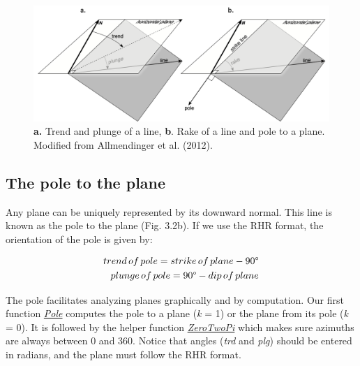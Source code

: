 \documentclass[a4paper , 12pt]{book}
\begin{document}
\begin{figure}[ht]
    \centering
    \includegraphics[width=13cm]{Figures/ch3f2.png}
    \caption{\textbf{a.} Trend and plunge of a line, \textbf{b}. Rake of a line and pole to a plane. Modified from Allmendinger et al. (2012).}
\end{figure}

\subsection{The pole to the plane}

Any plane can be uniquely represented by its downward normal. This line is known as the pole to the plane (Fig. 3.2b). If we use the RHR format, the orientation of the pole is given by:

\begin{equation}
    \begin{split}
        trend\,of\,pole = strike\,of\,plane -90\degree \\
        plunge\,of\,pole = 90\degree - dip\,of\,plane
    \end{split}
\end{equation}

The pole facilitates analyzing planes graphically and by computation. Our first function \href{https://github.com/nfcd/compGeo/blob/master/source/functions/Pole.py}{\textit{Pole}} computes the pole to a plane (\textit{k} = 1) or the plane from its pole (\textit{k} = 0). It is followed by the helper function \href{https://github.com/nfcd/compGeo/blob/master/source/functions/ZeroTwoPi.py}{\textit{ZeroTwoPi}} which makes sure azimuths are always between 0 and 360\degree. Notice that angles (\textit{trd} and \textit{plg}) should be entered in radians, and the plane must follow the RHR format.
\end{document}
